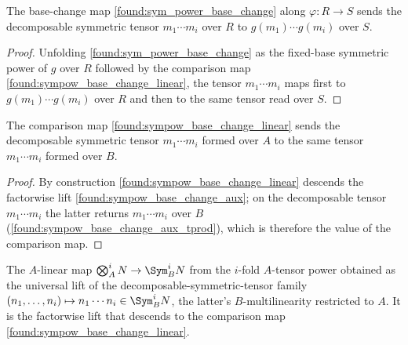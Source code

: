 \begin{lemma}
  \label{found:sym_base_change_map_tprod}
  The base-change map \cref{found:sym_power_base_change} along \(\varphi:R\to S\)
  sends the decomposable symmetric tensor \(m_1\cdots m_i\) over \(R\) to
  \(g(m_1)\cdots g(m_i)\) over \(S\).
\end{lemma}

\begin{proof}
  \leanok
  Unfolding \cref{found:sym_power_base_change} as the fixed-base symmetric power of
  \(g\) over \(R\) followed by the comparison map
  \cref{found:sympow_base_change_linear}, the tensor \(m_1\cdots m_i\) maps first
  to \(g(m_1)\cdots g(m_i)\) over \(R\) and then to the same tensor read over
  \(S\).
\end{proof}

\begin{lemma}
  \label{found:sympow_base_change_tprod}
  The comparison map \cref{found:sympow_base_change_linear} sends the decomposable
  symmetric tensor \(m_1\cdots m_i\) formed over \(A\) to the same tensor
  \(m_1\cdots m_i\) formed over \(B\).
\end{lemma}

\begin{proof}
  \leanok
  By construction \cref{found:sympow_base_change_linear} descends the factorwise
  lift \cref{found:sympow_base_change_aux}; on the decomposable tensor
  \(m_1\cdots m_i\) the latter returns \(m_1\cdots m_i\) over \(B\)
  (\cref{found:sympow_base_change_aux_tprod}), which is therefore the value of the
  comparison map.
\end{proof}

\begin{lemma}
  \label{found:sympow_base_change_aux}
  The \(A\)-linear map \(\bigotimes^i_A N\to\Sym^i_B N\) from the \(i\)-fold
  \(A\)-tensor power obtained as the universal lift of the
  decomposable-symmetric-tensor family
  \((n_1,\dots,n_i)\mapsto n_1\cdots n_i\in\Sym^i_B N\), the latter's
  \(B\)-multilinearity restricted to \(A\).  It is the factorwise lift that
  descends to the comparison map \cref{found:sympow_base_change_linear}.
\end{lemma}

